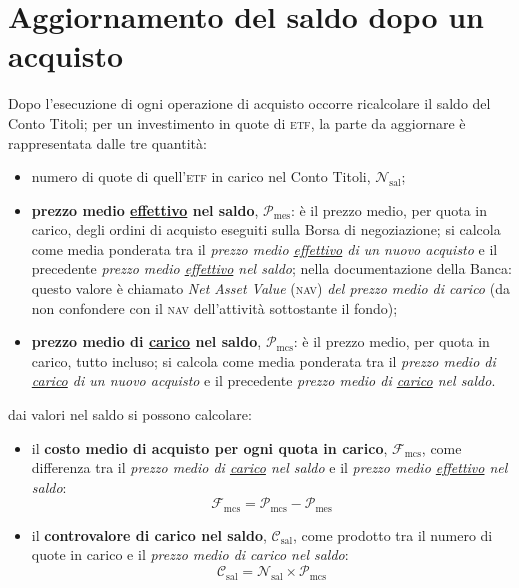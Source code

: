 \documentclass[12pt,a4paper]{article}
\newcommand{\Nav}[0]{\textsc{nav}}
\newcommand{\Etf}[1]{\textsc{etf}}
\newcommand{\Nsal}[1]{\mathcal{N}_{\textrm{sal}#1}}
\newcommand{\Pme}[1]{\mathcal{P}_{\mathrm{me}#1}}
\newcommand{\Pmes}[1]{\Pme{\mathrm{s}#1}}
\newcommand{\Pmc}[1]{\mathcal{P}_{\mathrm{mc}#1}}
\newcommand{\Pmcs}[1]{\Pmc{\mathrm{s}#1}}
\newcommand{\Csal}[1]{\mathcal{C}_{\mathrm{sal}#1}}
\newcommand{\Fmcs}[1]{\mathcal{F}_{\mathrm{mcs}#1}}
\begin{document}
\section{Aggiornamento del saldo dopo un acquisto}




Dopo l'esecuzione di ogni operazione di acquisto  occorre ricalcolare il saldo del Conto Titoli; per
un investimento in quote di \Etf{}, la parte da aggiornare è rappresentata dalle tre quantità:
\begin{itemize}
\item numero di quote di quell'\Etf{} in carico nel Conto Titoli, \(\Nsal{}\);
\item \textbf{prezzo  medio \underline{effettivo} nel  saldo}, \(\Pmes{}\):  è il prezzo  medio, per
  quota in carico,  degli ordini di acquisto  eseguiti sulla Borsa di negoziazione;  si calcola come
  media  ponderata tra  il  \emph{prezzo medio  \underline{effettivo}  di un  nuovo  acquisto} e  il
  precedente \emph{prezzo medio \underline{effettivo} nel  saldo}; nella documentazione della Banca:
  questo valore è chiamato \emph{Net Asset Value} (\Nav{}) \emph{del prezzo medio di carico} (da non
  confondere con il \Nav{} dell'attività sottostante il fondo);
\item \textbf{prezzo  medio di \underline{carico}  nel saldo}, \(\Pmcs{}\):  è il prezzo  medio, per
  quota in  carico, tutto  incluso; si  calcola come media  ponderata tra  il \emph{prezzo  medio di
     \underline{carico}   di  un   nuovo   acquisto}   e  il   precedente   \emph{prezzo  medio   di
     \underline{carico} nel saldo}.
\end{itemize}
dai valori nel saldo si possono calcolare:
\begin{itemize}
\item il \textbf{costo medio di acquisto per ogni quota in carico}, \(\Fmcs{}\), come differenza tra
  il   \emph{prezzo   medio   di   \underline{carico}   nel   saldo}   e   il   \emph{prezzo   medio
     \underline{effettivo} nel saldo}:
  \begin{equation*}
    \Fmcs{} = \Pmcs{} - \Pmes{}
  \end{equation*}
\item il  \textbf{controvalore di  carico nel saldo},  \(\Csal{}\), come prodotto  tra il  numero di
  quote in carico e il \emph{prezzo medio di carico nel saldo}:
  \begin{equation*}
    \Csal{} = \Nsal{} \times{} \Pmcs{}
  \end{equation*}
\end{itemize}
\end{document}
